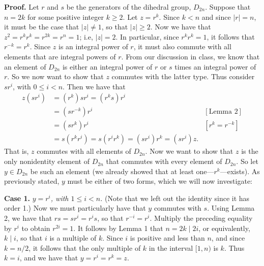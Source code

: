 \documentclass[9pt]{article}
\begin{document}
\begin{enumerate}
      \textbf{Proof.} Let $r$ and $s$ be the generators of the dihedral group,
      $D_{2n}$. Suppose that $n = 2k$ for some positive integer $k \ge 2$.
      Let $z = r^k$. Since $k < n$ and since $|r| = n$, it must be
      the case that $|z| \neq 1$, so that $|z| \ge 2$. Now we have that
      $z^2 = r^kr^k = r^{2k} = r^n = 1$; i.e, $|z| = 2$. In particular, since
      $r^kr^k = 1$, it follows that $r^{-k} = r^k$. Since $z$ is an integral
      power of $r$, it must also commute with all elements that are integral 
      powers of $r$. From our discussion in class, we know that an element of
      $D_{2n}$ is either an integral power of $r$ or $s$ times an integral power
      of $r$. So we now want to show that $z$ commutes with the latter type.
      Thus consider $sr^i$, with $0 \le i < n$. Then we have that
      \begin{align*}
         z(sr^i) &= (r^k)sr^i = (r^ks)r^i  \\
               &= (sr^{-k})r^i  &[\text{Lemma 2}] \\
               &= (sr^k)r^i     &[r^k = r^{-k}] \\
               &= s(r^kr^i) = s(r^ir^k) = (sr^i)r^k = (sr^i)z.
      \end{align*}
      That is, $z$ commutes with all elements of $D_{2n}$. Now we want to show
      that $z$ is the only nonidentity element of $D_{2n}$ that commutes with
      every element of $D_{2n}$. So let $y \in D_{2n}$ be such an element (we
      already showed that at least one---$r^k$---exists). As previously stated,
      $y$ must be either of two forms, which we will now investigate:
      
      \textbf{Case 1.} \textit{$y = r^i$, with $1 \le i < n$.} (Note that we
      left out the identity since it has order 1.) Now we must particularly have 
      that $y$ commutes with $s$. Using Lemma 2, we have that
      $rs = sr^i = r^is$, so that $r^{-i} = r^i$. Multiply the preceding 
      equality by $r^i$ to obtain $r^{2i} = 1$. It follows by Lemma 1 that
      $n = 2k \mid 2i$, or equivalently, $k \mid i$, so that $i$ is a multiple
      of $k$. Since $i$ is positive and less than $n$, and since $k = n/2$, it 
      follows that the only multiple of $k$ in the interval $[1, n)$ is $k$.
      Thus $k = i$, and we have that $y = r^i = r^k = z$.
      

\end{enumerate}
\end{document}
